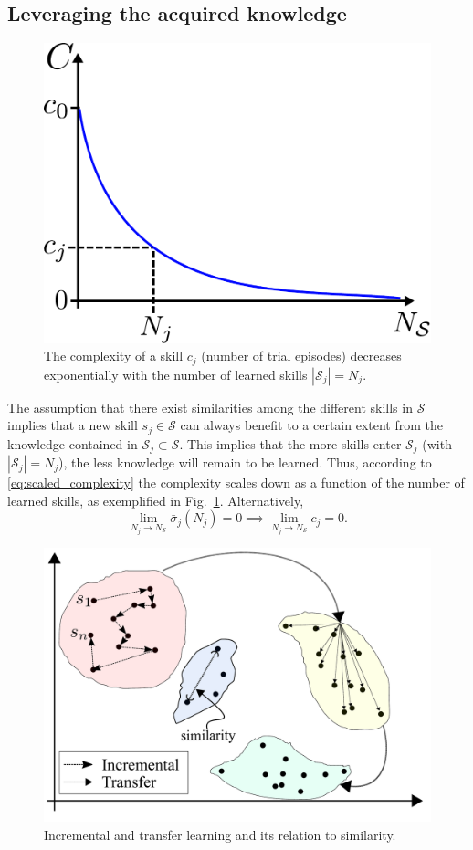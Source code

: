 \subsection{Leveraging the acquired knowledge}
\begin{figure}[!t]
	\centering
	\includegraphics[width=0.7\columnwidth]{fig/complexity_per_cardinality.pdf}
	\caption{The complexity of a skill $c_j$ (number of trial episodes) decreases exponentially with the number of learned skills $|\mathcal{S}_j|=N_{j}$.}
	\label{fig:complexity_per_cardinality}
\end{figure}
The assumption that there exist similarities among the different skills in $\mathcal{S}$ implies that a new skill $s_j \in \mathcal{S}$ can always benefit to a certain extent from the knowledge contained in $\mathcal{S}_j \subset \mathcal{S}$. This implies that the more skills enter $\mathcal{S}_j$ (with $|\mathcal{S}_j| = N_j$), the less knowledge will remain to be learned. Thus, according to \eqref{eq:scaled_complexity} the complexity scales down as a function of the number of learned skills, as exemplified in Fig.~\ref{fig:complexity_per_cardinality}. Alternatively,
\begin{equation}\label{eq:knowledge_limit}
    \lim_{N_{j}\to N_{\mathcal{S}}} \bar{\sigma}_j(N_j) = 0 \implies \lim_{N_{j}\to N_{\mathcal{S}}} c_j = 0.
\end{equation}
\begin{figure}[!ht]
	\centering
	\includegraphics[width=0.9\columnwidth]{fig/incremental_transfer_similarity_v2.pdf}
	\caption{Incremental and transfer learning and its relation to similarity.}
	\label{fig:incremental_transfer_similarity}
\end{figure}
